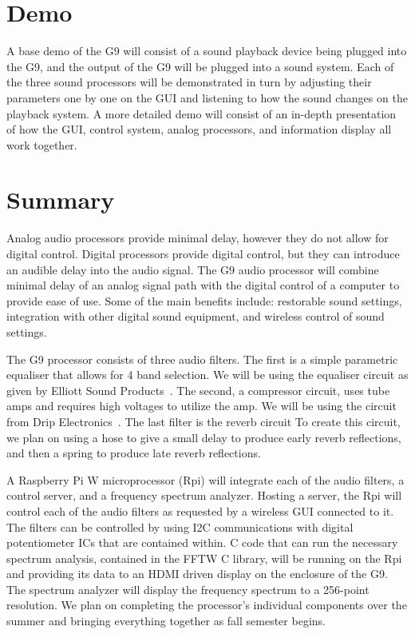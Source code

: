 \documentclass[journal]{IEEEtran}
\begin{document}
	\section{Demo}
	A base demo of the G9 will consist of a sound playback device being plugged into the G9, and the output of the G9 will be plugged into a sound system. Each of the three sound processors will be demonstrated in turn by adjusting their parameters one by one on the GUI and listening to how the sound changes on the playback system. A more detailed demo will consist of an in-depth presentation of how the GUI, control system, analog processors, and information display all work together.
	
	
	\section{Summary}
	Analog audio processors provide minimal delay, however they do not allow for digital control.  Digital processors provide digital control, but they can introduce an audible delay into the audio signal.  The G9 audio processor will combine minimal delay of an analog signal path with the digital control of a computer to provide ease of use.  Some of the main benefits include: restorable sound settings, integration with other digital sound equipment, and wireless control of sound settings.
	
	The G9 processor consists of three audio filters. The first is a simple parametric equaliser that allows for 4 band selection.  We will be using the equaliser circuit as given by Elliott Sound Products~\cite{espEq}.  The second, a compressor circuit, uses tube amps and requires high voltages to utilize the amp.  We will be using the circuit from Drip Electronics~\cite{opto7}. The last filter is the reverb circuit  To create this circuit, we plan on using a hose to give a small delay to produce early reverb reflections, and then a spring to produce late reverb reflections.
	
	A Raspberry Pi W microprocessor (Rpi) will integrate each of the audio filters, a control server, and a frequency spectrum analyzer.  Hosting a server, the Rpi will control each of the audio filters as requested by a wireless GUI connected to it.  The filters can be controlled by using I2C communications with digital potentiometer ICs that are contained within.  C code that can run the necessary spectrum analysis, contained in the FFTW C library, will be running on the Rpi and providing its data to an HDMI driven display on the enclosure of the G9.  The spectrum analyzer will display the frequency spectrum to a 256-point resolution. We plan on completing the processor’s individual components over the summer and bringing everything together as fall semester begins. 
	
\end{document}
